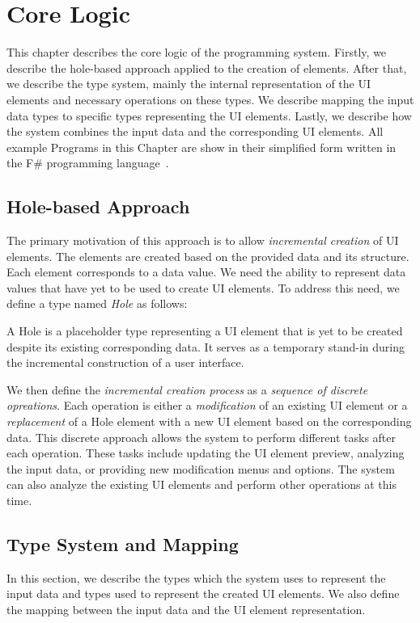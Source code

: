 \chapter{Core Logic}
\label{chap:corelogic}

This chapter describes the core logic of the programming system.
Firstly, we describe the hole-based approach applied to the creation of elements.
After that, we describe the type system, mainly the internal representation of the UI elements and necessary operations on these types.
We describe mapping the input data types to specific types representing the UI elements.
Lastly, we describe how the system combines the input data and the corresponding UI elements.
All example Programs in this Chapter are show in their simplified form written in the F\# programming language~.

\section{Hole-based Approach}
\label{sec:hole-based}
The primary motivation of this approach is to allow \emph{incremental creation} of UI elements.
The elements are created based on the provided data and its structure.
Each element corresponds to a data value.
We need the ability to represent data values that have yet to be used to create UI elements.
To address this need, we define a type named \emph{Hole} as follows:
\begin{defn}
	A Hole is a placeholder type representing a UI element that is yet to be created despite its existing corresponding data. It serves as a temporary stand-in during the incremental construction of a user interface.
\end{defn}

We then define the \emph{incremental creation process} as a \emph{sequence of discrete opreations}.
Each operation is either a \emph{modification} of an existing UI element or a \emph{replacement} of a Hole element with a new UI element based on the corresponding data.
This discrete approach allows the system to perform different tasks after each operation.
These tasks include updating the UI element preview, analyzing the input data, or providing new modification menus and options.
The system can also analyze the existing UI elements and perform other operations at this time.


\section{Type System and Mapping}
\label{sec:types}
In this section, we describe the types which the system uses to represent the input data and types used to represent the created UI elements.
We also define the mapping between the input data and the UI element representation.


